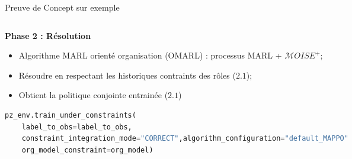     
    \begin{frame}[fragile]{Preuve de Concept sur exemple}{}
    
    \begin{columns}
    
        \begin{column}{0.6\textwidth}
    
            \textbf{Phase 2 : Résolution}
    
            \begin{itemize}
                \item Algorithme MARL orienté organisation (OMARL) : processus MARL + $\mathcal{M}OISE^+$;
                \item Résoudre en respectant les historiques contraints des rôles ($2.1$);
                \item Obtient la politique conjointe entrainée ($2.1$)
            \end{itemize}

            \begin{lstlisting}[language=Python,basicstyle=\scriptsize]
pz_env.train_under_constraints(
    label_to_obs=label_to_obs,
    constraint_integration_mode="CORRECT",algorithm_configuration="default_MAPPO"
    org_model_constraint=org_model)
            \end{lstlisting}

        \end{column}
    

\end{columns}
\end{frame}
